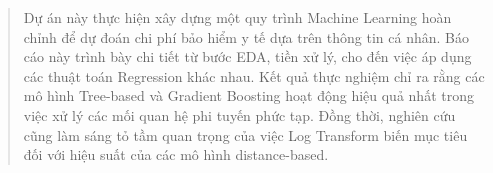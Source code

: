 \begin{abstract}
Dự án này thực hiện xây dựng một quy trình Machine Learning hoàn chỉnh để dự đoán chi phí bảo hiểm y tế dựa trên thông tin cá nhân. Báo cáo này trình bày chi tiết từ bước EDA, tiền xử lý, cho đến việc áp dụng các thuật toán Regression khác nhau. Kết quả thực nghiệm chỉ ra rằng các mô hình Tree-based và Gradient Boosting hoạt động hiệu quả nhất trong việc xử lý các mối quan hệ phi tuyến phức tạp. Đồng thời, nghiên cứu cũng làm sáng tỏ tầm quan trọng của việc Log Transform biến mục tiêu đối với hiệu suất của các mô hình distance-based.
\end{abstract}

